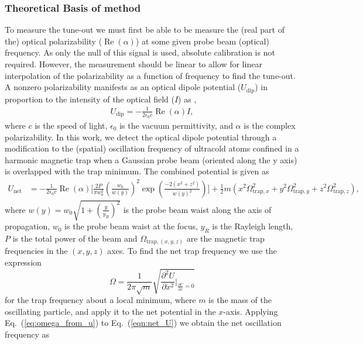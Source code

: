\subsubsection{Theoretical Basis of method}
	To measure the tune-out we must first be able to be measure the (real part of the) optical polarizability (\(\operatorname{Re}(\alpha)\)) at some given probe beam (optical) frequency. As only the null of this signal is used, absolute calibration is not required. However, the measurement should be linear to allow for linear interpolation of the polarizability as a function of frequency to find the tune-out.  A nonzero polarizability manifests as an optical dipole potential (\(U_{\mathrm{dip}}\)) in proportion to the intensity of the optical field (\(I\)) as \cite{Grimm00},
	 \begin{align}
	    U_{\mathrm{dip}}=-\frac{1}{2 \epsilon_{0} c} \operatorname{Re}(\alpha) I ,
	\end{align}
	where \(c\) is the speed of light, \(\epsilon_{0}\) is the vacuum permittivity, and \(\alpha\) is the complex polarizability. In this work, we detect the optical dipole potential through a modification to the (spatial) oscillation frequency of ultracold atoms confined in a harmonic magnetic trap when a Gaussian probe beam (oriented along the y axis) is overlapped with the trap minimum. The combined potential is given as
	 \begin{align}
	    U_{\mathrm{net}}& =-\frac{1}{2 \epsilon_{0} c} \operatorname{Re}(\alpha) 
	    \bigg[ 
	        \frac{2 P}{\pi w_0^2} \left(\frac{w_0}{w(y)}\right)^2 \exp\left( \frac{-2 (x^2+z^2)}{w(y)^2} \right)
	    \bigg]
	    + \frac{1}{2} m (x^2 \Omega_{\text{trap},x}^2  +y^2 \Omega_{\text{trap},y}^2  +z^2 \Omega_{\text{trap},z}^2 ), \label{eqn:net_U}
	 \end{align}
	where \(w(y) = w_0 \sqrt{1+\left( \frac{y}{y_R} \right)^2 }\) is the probe beam waist along the axis of propagation, \(w_0\) is the probe beam waist at the focus, \(y_R\) is the Rayleigh length, \(P\) is the total power of the beam and \( \Omega_{\text{trap},(x,y,z)} \) are the magnetic trap frequencies in the \((x,y,z)\) axes.
	To find the net trap frequency we use the expression   
	\begin{equation}
	\Omega=\frac{1}{2\pi\sqrt{m}} \sqrt{\frac{\partial^{2} U}{\partial x^{2}} \biggr\rvert_{\frac{\partial U}{\partial x}=0}}
	\label{eq:omega_from_u}
	\end{equation}
	for the trap frequency about a local minimum, where \(m\) is the mass of the oscillating particle, and apply it to the net potential in the \(x\)-axis. Applying Eq.~(\ref{eq:omega_from_u}) to Eq.~(\ref{eqn:net_U}) we obtain the net oscillation frequency as
